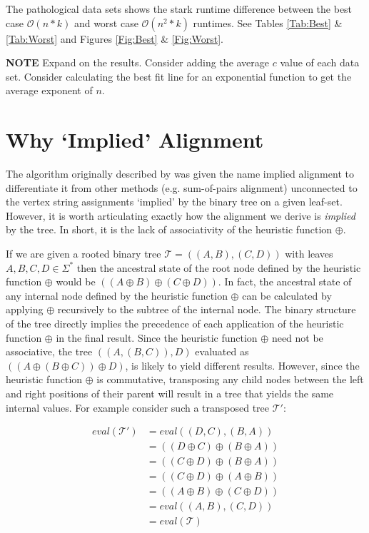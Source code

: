 \documentclass[11pt]{article}
\begin{document}
The pathological data sets shows the stark runtime difference between the best case $\mathcal{O}(n * k)$ and worst case $\mathcal{O}(n^2 * k)$ runtimes. See Tables \ref{Tab:Best} \& \ref{Tab:Worst} and Figures \ref{Fig:Best} \& \ref{Fig:Worst}.

\textbf{NOTE}
Expand on the results. 
Consider adding the average $c$ value of each data set. 
Consider calculating the best fit line for an exponential function to get the average exponent of $n$.

\section{Why `Implied' Alignment}

The algorithm originally described by \cite{Wheeler2003} was given the name implied alignment to differentiate it from other methods (e.g. sum-of-pairs alignment) unconnected to the vertex string assignments `implied' by the binary tree on a given leaf-set. 
However, it is worth articulating exactly how the alignment we derive is \emph{implied} by the tree.  
In short, it is the lack of associativity of the heuristic function $\oplus$.

If we are given a rooted binary tree $\mathcal{T} = ((A,B),(C,D))$ with leaves $A, B, C, D \in \Sigma^{*}$ then the ancestral state of the root node defined by the heuristic function $\oplus$ would be $((A \oplus B) \oplus (C \oplus D))$. 
In fact, the ancestral state of any internal node defined by the heuristic function $\oplus$ can be calculated by applying $\oplus$ recursively to the subtree of the internal node. 
The binary structure of the tree directly implies the precedence of each application of the heuristic function $\oplus$ in the final result. Since the heuristic function $\oplus$ need not be associative, the tree $((A,(B,C)),D)$ evaluated as $((A \oplus (B \oplus C)) \oplus D)$, is likely to yield different results. 
However, since the heuristic function $\oplus$ is commutative, transposing any child nodes between the left and right positions of their parent will result in a tree that yields the same internal values. 
For example consider such a transposed tree $\mathcal{T'}$:

\begin{align*}
  eval(\mathcal{T'}) &= eval((D,C),(B,A))
\\  &= ((D \oplus C) \oplus (B \oplus A))
\\  &= ((C \oplus D) \oplus (B \oplus A))
\\  &= ((C \oplus D) \oplus (A \oplus B))
\\  &= ((A \oplus B) \oplus (C \oplus D))
\\  &= eval((A,B),(C,D))
\\  &= eval(\mathcal{T})
\end{align*}
\end{document}
